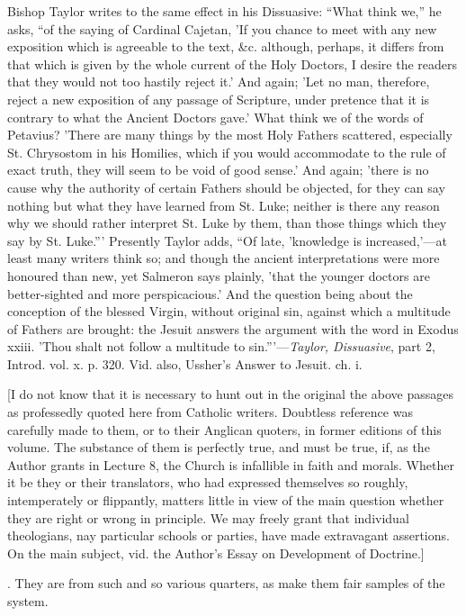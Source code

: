 {Bishop Taylor writes to the same effect in his
Dissuasive: ``What think we,'' he asks, ``of the saying of
Cardinal Cajetan, 'If you chance to meet with any new exposition which
is agreeable to the text, \&c. although, perhaps, it differs from
that which is given by the whole current of the Holy Doctors, I desire
the readers that they would not too hastily reject it.' And again;
'Let no man, therefore, reject a new exposition of any passage of
Scripture, under pretence that it is contrary to what the Ancient
Doctors gave.' What think we of the words of Petavius? 'There are many
things by the most Holy Fathers scattered, especially St. Chrysostom
in his Homilies, which if you would accommodate to the rule of exact
truth, they will seem to be void of good sense.' And again; 'there is
no cause why the authority of certain Fathers should be objected, for
they can say nothing but what they have learned from St. Luke; neither
is there any reason why we should rather interpret St. Luke by them,
than those things which they say by St. Luke.''' Presently Taylor
adds, ``Of late, 'knowledge is increased,'—at least many writers
think so; and though the ancient interpretations were more honoured
than new, yet Salmeron says plainly, 'that the younger doctors are
better-sighted and more perspicacious.' And the question being about
the conception of the blessed Virgin, without original sin, against
which a multitude of Fathers are brought: the Jesuit answers the
argument with the word in Exodus xxiii. 'Thou shalt not follow a
multitude to sin.'''—\emph{Taylor, Dissuasive}, part 2, Introd.
vol. x. p. 320. Vid. also, Ussher's Answer to Jesuit. ch. i.

[I do not know that it is necessary to hunt out in
the original the above passages as professedly quoted here from
Catholic writers. Doubtless reference was carefully made to them, or
to their Anglican quoters, in former editions of this volume. The
substance of them is perfectly true, and must be true, if, as the
Author grants in Lecture 8, the Church is infallible in faith and
morals. Whether it be they or their translators, who had expressed
themselves so roughly, intemperately or flippantly, matters little in
view of the main question whether they are right or wrong in
principle. We may freely grant that individual theologians, nay
particular schools or parties, have made extravagant assertions. On
the main subject, vid. the Author's Essay on Development of
Doctrine.]}. They
are from such and so various quarters, as make them fair samples of
the system.

